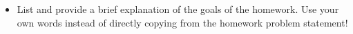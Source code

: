 

\begin{itemize}
\item  List and provide a brief explanation of the goals of the homework. Use your own words instead of directly copying from the homework problem statement!
\end{itemize}
